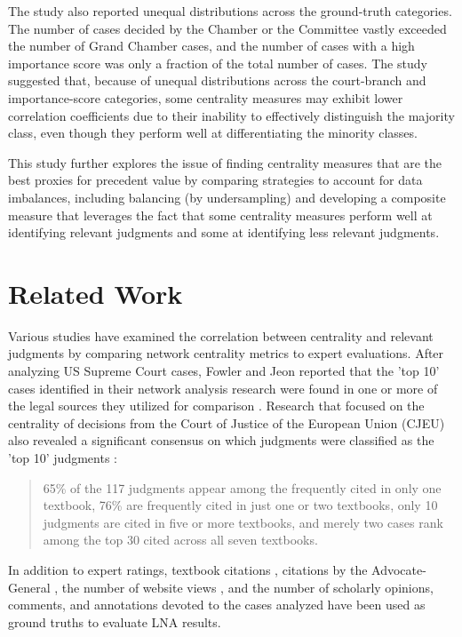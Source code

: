 \documentclass[sigconf,authordraft]{acmart}
\begin{document}
The study also reported unequal distributions across the ground-truth categories. The number of cases decided by the Chamber or the Committee vastly exceeded the number of Grand Chamber cases, and the number of cases with a high importance score was only a fraction of the total number of cases.
The study suggested that, because of unequal distributions across the court-branch and importance-score categories, some centrality measures may exhibit lower correlation coefficients due to their inability to effectively distinguish the majority class, even though they perform well at differentiating the minority classes.

This study further explores the issue of finding centrality measures that are the best proxies for precedent value by comparing strategies to account for data imbalances, including balancing (by undersampling) and developing a composite measure that leverages the fact that some centrality measures perform well at identifying relevant judgments and some at identifying less relevant judgments.


\section{Related Work}

Various studies have examined the correlation between centrality and relevant judgments by comparing network centrality metrics to expert evaluations. After analyzing US Supreme Court cases, Fowler and Jeon reported that the 'top 10' cases identified in their network analysis research were found in one or more of the legal sources they utilized for comparison \cite{FOWLER200816}.
Research that focused on the centrality of decisions from the Court of Justice of the European Union (CJEU) also revealed a significant consensus on which judgments were classified as the 'top 10' judgments \cite{Derlen_etal_2014}:

\begin{quote}
  65\% of the 117 judgments appear among the frequently cited in only one textbook, 76\% are frequently cited in just one or two textbooks, only 10 judgments are cited in five or more textbooks, and merely two cases rank among the top 30 cited across all seven textbooks.
\end{quote}

In addition to expert ratings, textbook citations \cite{Derlen_etal_2014}, citations by the Advocate-General \cite{Derlen_etal_2014}, the number of website views \cite{neale2013}, and the number of scholarly opinions, comments, and annotations devoted to the cases analyzed \cite{agnoloni2015, vanopijnen2014} have been used as ground truths to evaluate LNA results.
\end{document}
